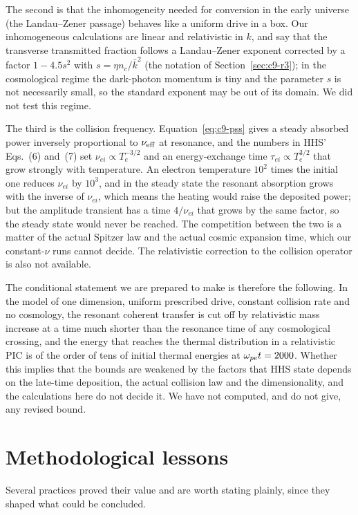 The second is that the inhomogeneity needed for conversion in the early universe (the Landau--Zener passage) behaves like a uniform drive in a box. Our inhomogeneous calculations are linear and relativistic in $k$, and say that the transverse transmitted fraction follows a Landau--Zener exponent corrected by a factor $1-4.5s^2$ with $s=\eta n_c/\bar k^2$ (the notation of Section~\ref{sec:c9-r3}); in the cosmological regime the dark-photon momentum is tiny and the parameter $s$ is not necessarily small, so the standard exponent may be out of its domain. We did not test this regime.

The third is the collision frequency. Equation~\eqref{eq:c9-pss} gives a steady absorbed power inversely proportional to $\nu_{\rm eff}$ at resonance, and the numbers in HHS' Eqs.~(6) and~(7) set $\nu_{ei}\propto T_e^{-3/2}$ and an energy-exchange time $\tau_{ei}\propto T_e^{3/2}$ that grow strongly with temperature. An electron temperature $10^{2}$ times the initial one reduces $\nu_{ei}$ by $10^{3}$, and in the steady state the resonant absorption grows with the inverse of $\nu_{ei}$, which means the heating would raise the deposited power; but the amplitude transient has a time $4/\nu_{ei}$ that grows by the same factor, so the steady state would never be reached. The competition between the two is a matter of the actual Spitzer law and the actual cosmic expansion time, which our constant-$\nu$ runs cannot decide. The relativistic correction to the collision operator is also not available.

The conditional statement we are prepared to make is therefore the following. In the model of one dimension, uniform prescribed drive, constant collision rate and no cosmology, the resonant coherent transfer is cut off by relativistic mass increase at a time much shorter than the resonance time of any cosmological crossing, and the energy that reaches the thermal distribution in a relativistic PIC is of the order of tens of initial thermal energies at $\omega_{pe} t=2000$. Whether this implies that the bounds are weakened by the factors that HHS state depends on the late-time deposition, the actual collision law and the dimensionality, and the calculations here do not decide it. We have not computed, and do not give, any revised bound.

\section{Methodological lessons}

Several practices proved their value and are worth stating plainly, since they shaped what could be concluded.

